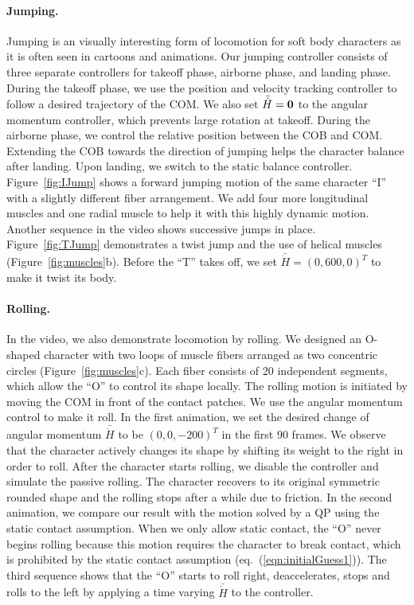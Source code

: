 \paragraph{Jumping.} Jumping is an visually interesting form of
locomotion for soft body characters as it is often seen in cartoons
and animations. Our jumping controller consists of three separate
controllers for takeoff phase, airborne phase, and landing
phase. During the takeoff phase, we use the position and velocity
tracking controller to follow a desired trajectory of the COM. We also
set $\bar{\dot{H}}=\mathbf{0}$ to the angular momentum controller, which
prevents large rotation at takeoff.  During the airborne phase, we control the relative
position between the COB and COM. Extending the COB towards the
direction of jumping helps the character balance after landing. Upon
landing, we switch to the static balance controller.
Figure~\ref{fig:IJump} shows a forward jumping motion of the same
character ``I'' with a slightly different fiber arrangement.
We add four more longitudinal muscles and one radial muscle to help it with this highly dynamic motion.
Another sequence in the video shows successive jumps in place.
Figure~\ref{fig:TJump} demonstrates
a twist jump and the use of helical muscles
(Figure~\ref{fig:muscles}b).  Before the ``T'' takes off, we set
$\bar{\dot{H}}=(0, 600, 0)^T$ to make it twist its body.

\paragraph{Rolling.} In the video, we also demonstrate
locomotion by rolling. We designed an O-shaped character with two
loops of muscle fibers arranged as two concentric circles
(Figure~\ref{fig:muscles}c). Each fiber consists of 20 independent segments, which allow
the ``O'' to control its shape locally. The rolling motion is initiated by moving the COM in front of the contact patches. We use the angular momentum control to
make it roll. In the first animation, we set the desired
change of angular momentum $\bar{\dot{H}}$ to be $(0, 0, -200)^T$ in
the first 90 frames. We observe that the character actively changes its
shape by shifting its weight to the right in order to roll. After the character starts rolling,
we disable the controller
and simulate the passive rolling. The character recovers to its
original symmetric rounded shape and the rolling stops after a while
due to friction. In the second animation, we compare our result with
the motion solved by a QP using the static contact assumption.  When we only
allow static contact, the ``O'' never begins rolling because this
motion requires the character to break contact, which is prohibited by the static contact assumption (eq.~(\ref{eqn:initialGuess1})).  The third sequence
shows that the ``O'' starts to roll right, deaccelerates, stops
and rolls to the left by applying a time varying $\bar{\dot{H}}$ to
the controller.

